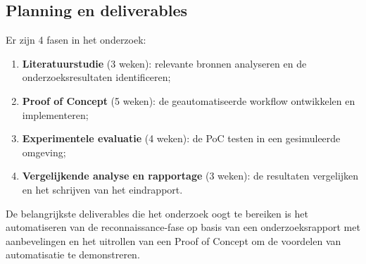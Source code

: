 \subsection{Planning en deliverables}
Er zijn 4 fasen in het onderzoek:
\begin{enumerate}
    \item \textbf{Literatuurstudie} (3 weken): relevante bronnen analyseren en de onderzoeksresultaten identificeren;
    \item \textbf{Proof of Concept} (5 weken): de geautomatiseerde workflow ontwikkelen en implementeren;
    \item \textbf{Experimentele evaluatie} (4 weken): de PoC testen in een gesimuleerde omgeving;
    \item \textbf{Vergelijkende analyse en rapportage} \newline (3 weken): de resultaten vergelijken en het schrijven van het eindrapport.
\end{enumerate}


De belangrijkste deliverables die het onderzoek oogt te bereiken is het automatiseren van de reconnaissance-fase op
basis van een onderzoeksrapport met aanbevelingen en het uitrollen van een Proof of Concept om de voordelen van automatisatie te demonstreren.






